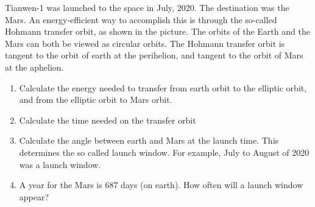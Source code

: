 \documentclass{article}
\begin{document}
\begin{problem}
Tianwen-1 was launched to the space in July, 2020. The destination was the Mars. An energy-efficient way to accomplish this is through the so-called Hohmann transfer orbit, as shown in the picture. The orbits of the Earth and the Mars can both be viewed as circular orbits. The Hohmann transfer orbit is tangent to the orbit of earth at the perihelion, and tangent to the orbit of Mars at the aphelion.
\begin{enumerate}
  \item[a.] Calculate the energy needed to transfer from earth orbit to the elliptic orbit, and from the elliptic orbit to Mars orbit.
  \item[b.] Calculate the time needed on the transfer orbit
  \item[c.] Calculate the angle between earth and Mars at the launch time. This determines the so called launch window. For example, July to August of 2020 was a launch window.
  \item[d.] A year for the Mars is 687 days (on earth). How often will a launch window appear?
\end{enumerate}
\begin{center}
  
\end{center}
\end{problem}
\end{document}
